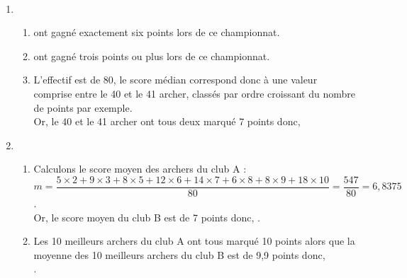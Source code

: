\ \\ [-5mm]
\begin{enumerate}
   \item
   \begin{enumerate}
      \item {} ont gagné exactement six points lors de ce championnat.
      \item {} ont gagné trois points ou plus lors de ce championnat.
      \item L'effectif est de 80, le score médian correspond donc à une valeur comprise entre le 40 et le 41 archer, classés par ordre croissant du nombre de points par exemple. \\
      Or, le 40 et le 41 archer ont tous deux marqué 7 points donc, 
   \end{enumerate}
   \item
   \begin{enumerate}
      \item Calculons le score moyen des archers du club A : \\ [1mm]
      $m =\dfrac{5\times2+9\times3+8\times5+12\times6+14\times7+6\times8+8\times9+18\times10}{80} =\dfrac{547}{80} =6,8375$. \\ [1mm]
      Or, le score moyen du club B est de 7 points donc, .
      \item Les 10 meilleurs archers du club A ont tous marqué 10 points alors que la moyenne des 10 meilleurs archers du club B est de 9,9 points donc, \\
      .
   \end{enumerate}
\end{enumerate}
